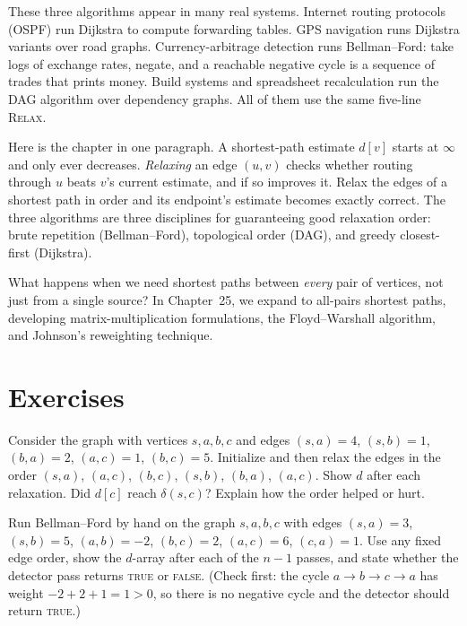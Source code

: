 \begin{aestheticbox}
These three algorithms appear in many real systems. Internet routing protocols
(OSPF) run Dijkstra to compute forwarding tables. GPS navigation runs Dijkstra
variants over road graphs. Currency-arbitrage detection runs Bellman--Ford: take
logs of exchange rates, negate, and a reachable negative cycle is a sequence of
trades that prints money. Build systems and spreadsheet recalculation run the DAG
algorithm over dependency graphs. All of them use the same five-line
\textsc{Relax}.
\end{aestheticbox}

\begin{recoverybox}
Here is the chapter in one paragraph.
A shortest-path estimate $d[v]$ starts at $\infty$ and only ever decreases.
\emph{Relaxing} an edge $(u,v)$ checks whether routing through $u$ beats $v$'s
current estimate, and if so improves it. Relax the edges of a shortest path in
order and its endpoint's estimate becomes exactly correct. The three algorithms
are three disciplines for guaranteeing good relaxation order: brute repetition
(Bellman--Ford), topological order (DAG), and greedy closest-first
(Dijkstra).
\end{recoverybox}

What happens when we need shortest paths between \emph{every} pair of vertices, not just from a single source? In Chapter~25, we expand to all-pairs shortest paths, developing matrix-multiplication formulations, the Floyd--Warshall algorithm, and Johnson's reweighting technique.

\section{Exercises}

\begin{exercise}\label{ch24:ex-relax-order}
Consider the graph with vertices $s,a,b,c$ and edges $(s,a)=4$, $(s,b)=1$,
$(b,a)=2$, $(a,c)=1$, $(b,c)=5$. Initialize and then relax the edges in the order
$(s,a)$, $(a,c)$, $(b,c)$, $(s,b)$, $(b,a)$, $(a,c)$. Show $d$ after each relaxation. Did $d[c]$
reach $\delta(s,c)$? Explain how the order helped or hurt.
\end{exercise}

\begin{exercise}\label{ch24:ex-bf-trace}
Run Bellman--Ford by hand on the graph $s,a,b,c$ with edges $(s,a)=3$, $(s,b)=5$,
$(a,b)=-2$, $(b,c)=2$, $(a,c)=6$, $(c,a)=1$. Use any fixed edge order, show the
$d$-array after each of the $n-1$ passes, and state whether the detector pass
returns \textsc{true} or \textsc{false}. (Check first: the cycle
$a\to b\to c\to a$ has weight $-2+2+1=1>0$, so there is no negative cycle and the
detector should return \textsc{true}.)
\end{exercise}

